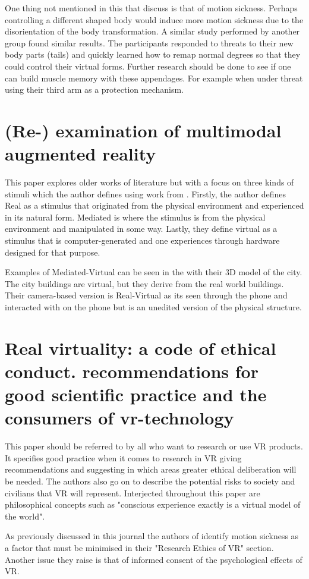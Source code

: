 \documentclass{scrartcl}
\begin{document}
 One thing not mentioned in this that \cite{mentzelopoulos2015hardware} discuss is that of motion sickness. Perhaps controlling a different shaped body would induce more motion sickness due to the disorientation of the body transformation. A similar study performed by another group found similar results\cite{steptoe2013human}. The participants responded to threats to their new body parts (tails) and quickly learned how to remap normal degrees so that they could control their virtual forms. Further research should be done to see if one can build muscle memory with these appendages. For example when under threat using their third arm as a protection mechanism\cite{chafe1996musical}.

\section {(Re-) examination of multimodal augmented reality\cite{rosa2016re}}
This paper explores older works of literature but with a focus on three kinds of stimuli which the author defines using work from \cite{bach2003sensory,milgram1994taxonomy,bayart2006haptic}. Firstly, the author defines Real as a stimulus that originated from the physical environment and experienced in its natural form. Mediated is where the stimulus is from the physical environment and manipulated in some way. Lastly, they define virtual as a stimulus that is computer-generated and one experiences through hardware designed for that purpose. 

Examples of Mediated-Virtual can be seen in the \cite{venta2014investigating} with their 3D model of the city. The city buildings are virtual, but they derive from the real world buildings.  Their camera-based version is Real-Virtual as its seen through the phone and interacted with on the phone but is an unedited version of the physical structure. 

\section {Real virtuality: a code of ethical conduct. recommendations for good scientific practice and the consumers of vr-technology\cite{madary2016real}}
This paper should be referred to by all who want to research or use VR products. It specifies good practice when it comes to research in VR giving recommendations and suggesting in which areas greater ethical deliberation will be needed. The authors also go on to describe the potential risks to society and civilians that VR will represent. Interjected throughout this paper are philosophical concepts such as "conscious experience exactly is a virtual model of the world".

As previously discussed in this journal the authors of \cite{madary2016real} identify motion sickness as a factor that must be minimised in their "Research Ethics of VR" section. Another issue they raise is that of informed consent of the psychological effects of VR. 



\end{document}
